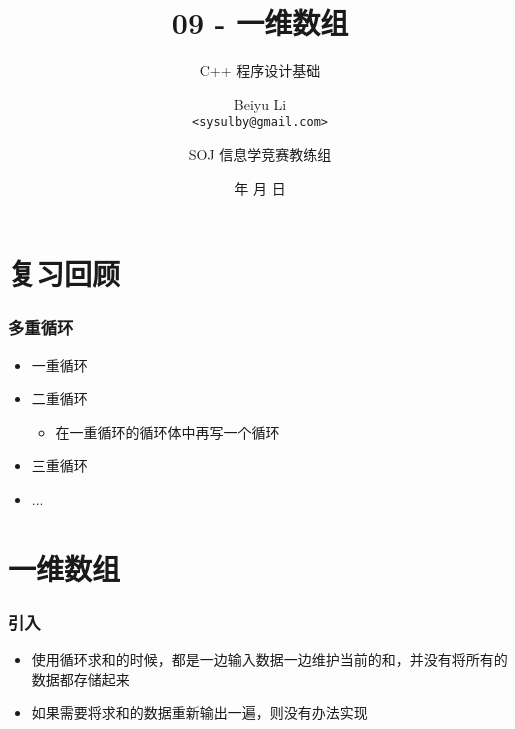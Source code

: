 \title[09 - 一维数组]
{09 - 一维数组}

\subtitle{C++ 程序设计基础}

\author[Beiyu Li]
{Beiyu Li\\
\texttt{<sysulby@gmail.com>}}


\date[\today]
{\number\year 年 \number\month 月 \number\day 日}




\author[sysulby]
{SOJ 信息学竞赛教练组}

\begin{frame}
    \titlepage
\end{frame}
\setcounter{framenumber}{0} %


\section{复习回顾}

\begin{frame}[fragile]
    \frametitle{多重循环}

    \begin{itemize}[<+->]
        \item 一重循环
        \item 二重循环
            \begin{itemize}
                \item 在一重循环的循环体中再写一个循环
            \end{itemize}
        \item 三重循环
        \item ...
    \end{itemize}
\end{frame}


\section{一维数组}

\begin{frame}[fragile]
    \frametitle{引入}

    \begin{itemize}[<+->]
        \item 使用循环求和的时候，都是一边输入数据一边维护当前的和，并没有将所有的数据都存储起来
        \item 如果需要将求和的数据重新输出一遍，则没有办法实现
    \end{itemize}
\end{frame}

